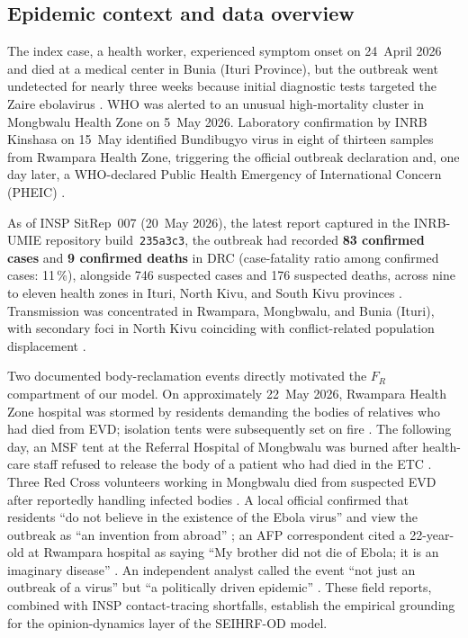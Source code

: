 \documentclass[12pt,a4paper]{article}
\begin{document}
\subsection{Epidemic context and data overview}

The index case, a health worker, experienced symptom onset on 24~April 2026
and died at a medical center in Bunia (Ituri Province), but the outbreak went
undetected for nearly three weeks because initial diagnostic tests targeted
the Zaire ebolavirus \citep{WHODON602}. WHO was alerted to an unusual
high-mortality cluster in Mongbwalu Health Zone on 5~May 2026. Laboratory
confirmation by INRB Kinshasa on 15~May identified Bundibugyo virus in eight
of thirteen samples from Rwampara Health Zone, triggering the official
outbreak declaration and, one day later, a WHO-declared Public Health
Emergency of International Concern (PHEIC) \citep{WHODON602,WHODON603}.

As of INSP SitRep~007 (20~May 2026), the latest report captured in the
INRB-UMIE repository build~\texttt{235a3c3}, the outbreak had recorded
\textbf{83 confirmed cases} and \textbf{9 confirmed deaths} in DRC
(case-fatality ratio among confirmed cases: 11\,\%), alongside 746 suspected
cases and 176 suspected deaths, across nine to eleven health zones in Ituri,
North Kivu, and South Kivu provinces \citep{WHODON603}. Transmission was
concentrated in Rwampara, Mongbwalu, and Bunia (Ituri), with secondary foci
in North Kivu coinciding with conflict-related population displacement
\citep{WHODON603}.

Two documented body-reclamation events directly motivated the $F_R$
compartment of our model. On approximately 22~May 2026, Rwampara Health Zone
hospital was stormed by residents demanding the bodies of relatives who had
died from EVD; isolation tents were subsequently set on fire
\citep{AlJazeera2026}. The following day, an MSF tent at the Referral Hospital
of Mongbwalu was burned after health-care staff refused to release the body of
a patient who had died in the ETC \citep{AlJazeera2026,Euronews2026}. Three
Red Cross volunteers working in Mongbwalu died from suspected EVD after
reportedly handling infected bodies \citep{NPR2026}. A local official
confirmed that residents ``do not believe in the existence of the Ebola virus''
and view the outbreak as ``an invention from abroad'' \citep{Euronews2026};
an AFP correspondent cited a 22-year-old at Rwampara hospital as saying
``My brother did not die of Ebola; it is an imaginary disease''
\citep{LeDevoir2026}. An independent analyst called the event ``not just an
outbreak of a virus'' but ``a politically driven epidemic'' \citep{DemNow2026}.
These field reports, combined with INSP contact-tracing shortfalls, establish
the empirical grounding for the opinion-dynamics layer of the SEIHRF-OD model.
\end{document}
